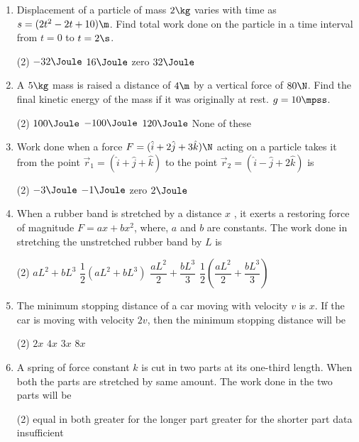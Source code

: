 \documentclass{article}
\newcommand{\ans}{\textcolor{red!95}{\textit{\quad}}}
\begin{document}
\begin{enumerate}
\item Displacement of a particle of mass $2 \kg$ varies with time as $s = (2t^2 - 2t + 10) \m$. Find total work done on the particle in a time interval from $t = 0$ to $t = 2 \s$.
\begin{tasks}(2)
	\task $-32\Joule$
	\task $16\Joule$
	\task zero
	\task $32\Joule$\ans
\end{tasks}

\item A $5\kg$ mass is raised a distance of $4\m$ by a vertical force of $80\N$. Find the final kinetic energy of the mass if it was originally at rest. $g = 10\mpss$.
\begin{tasks}(2)
	\task $100\Joule$
	\task $-100\Joule$
	\task $120\Joule$\ans
	\task None of these
\end{tasks}

\item Work done when a force $F=(\hat{i}+2\hat{j}+3\hat{k})\N$ acting on a particle takes it from the point $\vec{r}_1 = (\hat{i} + \hat{j} + \hat{k} )$ to the point $\vec{r}_2 = (\hat{i} - \hat{j} + 2 \hat{k} )$ is
\begin{tasks}(2)
	\task $-3\Joule$
	\task $-1\Joule$\ans
	\task zero
	\task $2\Joule$
\end{tasks}

\item When a rubber band is stretched by a distance $x$ , it
exerts a restoring force of magnitude $F = ax + bx^2$, where, $a$ and $b$ are constants. The work done in stretching the unstretched rubber band by $L$ is
\begin{tasks}(2)
	\task $aL^2+bL^3$
	\task $\dfrac{1}{2}\left(aL^2+bL^3\right)$
	\task $\dfrac{aL^2}{2} + \dfrac{bL^3}{3}$\ans
	\task $\dfrac{1}{2}\left( \dfrac{aL^2}{2} + \dfrac{bL^3}{3} \right)$
\end{tasks}



\item The minimum stopping distance of a car moving with velocity $v$ is $x$. If the car is moving with velocity $2v$, then the minimum stopping distance will be
\begin{tasks}(2)
	\task $2x$
	\task $4x$\ans
	\task $3x$
	\task $8x$
\end{tasks}

\item A spring of force constant $k$ is cut in two parts at its one-third length. When both the parts are stretched by same amount. The work done in the two parts will be
\begin{tasks}(2)
	\task equal in both
	\task greater for the longer part
	\task greater for the shorter part\ans
	\task data insufficient
\end{tasks}


\end{enumerate}
\end{document}
